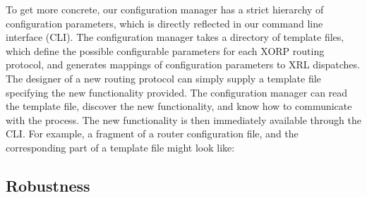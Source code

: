 To get more concrete, our configuration manager has a strict hierarchy
of configuration parameters, which is directly reflected in our
command line interface (CLI).  The configuration manager takes a
directory of template files, which define the possible configurable
parameters for each XORP routing protocol, and generates mappings of
configuration parameters to XRL dispatches.  The designer of a new
routing protocol can simply supply a template file specifying the new
functionality provided.  The configuration manager can read the
template file, discover the new functionality, and know how to
communicate with the process.  The new functionality is then
immediately available through the CLI.
For example, a fragment of a router configuration file, and the
corresponding part of a template file might look like:

\noindent{}

\subsection{Robustness}


